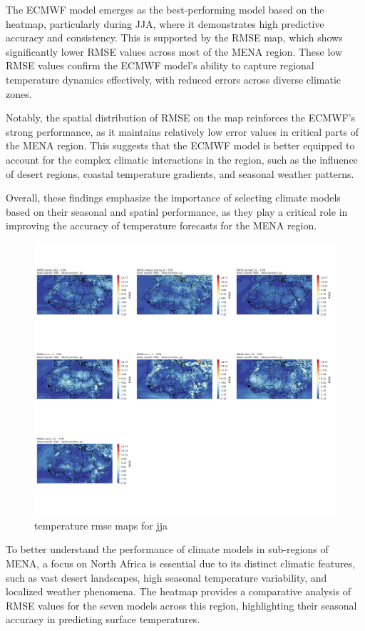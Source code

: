 The ECMWF model emerges as the best-performing model based on the heatmap, particularly during JJA, where it demonstrates high predictive accuracy and consistency. This is supported by the RMSE map, which shows significantly lower RMSE values across most of the MENA region. These low RMSE values confirm the ECMWF model's ability to capture regional temperature dynamics effectively, with reduced errors across diverse climatic zones.

Notably, the spatial distribution of RMSE on the map reinforces the ECMWF's strong performance, as it maintains relatively low error values in critical parts of the MENA region. This suggests that the ECMWF model is better equipped to account for the complex climatic interactions in the region, such as the influence of desert regions, coastal temperature gradients, and seasonal weather patterns.

Overall, these findings emphasize the importance of selecting climate models based on their seasonal and spatial performance, as they play a critical role in improving the accuracy of temperature forecasts for the MENA region.

\begin{figure}[H]
    \centering
    \includegraphics[width=1\linewidth]{plots/det/rmse/rmse_jja_t2m.png}
    \caption{temperature rmse maps for jja}
\end{figure}
To better understand the performance of climate models in sub-regions of MENA, a focus on North Africa is essential due to its distinct climatic features, such as vast desert landscapes, high seasonal temperature variability, and localized weather phenomena. The heatmap provides a comparative analysis of RMSE values for the seven models across this region, highlighting their seasonal accuracy in predicting surface temperatures.

